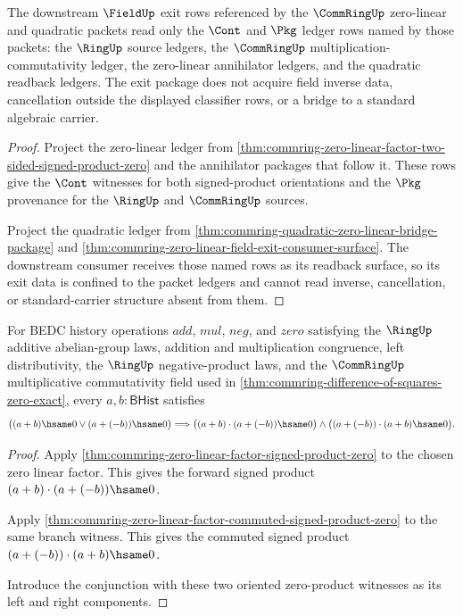 \begin{theorem}
\label{thm:commring-scoped-ledger-source}
The downstream $\FieldUp$ exit rows referenced by the $\CommRingUp$
zero-linear and quadratic packets read only the $\Cont$ and $\Pkg$ ledger rows
named by those packets: the $\RingUp$ source ledgers, the
$\CommRingUp$ multiplication-commutativity ledger, the zero-linear
annihilator ledgers, and the quadratic readback ledgers. The exit package does
not acquire field inverse data, cancellation outside the displayed classifier
rows, or a bridge to a standard algebraic carrier.
\end{theorem}
\begin{proof}
Project the zero-linear ledger from
\autoref{thm:commring-zero-linear-factor-two-sided-signed-product-zero} and
the annihilator packages that follow it. These rows give the $\Cont$ witnesses
for both signed-product orientations and the $\Pkg$ provenance for the
$\RingUp$ and $\CommRingUp$ sources.

Project the quadratic ledger from
\autoref{thm:commring-quadratic-zero-linear-bridge-package} and
\autoref{thm:commring-zero-linear-field-exit-consumer-surface}. The
downstream consumer receives those named rows as its readback surface, so its
exit data is confined to the packet ledgers and cannot read inverse,
cancellation, or standard-carrier structure absent from them.
\end{proof}

\begin{theorem}
\label{thm:commring-zero-linear-factor-two-sided-signed-product-zero}
For BEDC history operations $add$, $mul$, $neg$, and $zero$ satisfying the
$\RingUp$ additive abelian-group laws, addition and multiplication congruence,
left distributivity, the $\RingUp$ negative-product laws, and the
$\CommRingUp$ multiplicative commutativity field used in
\autoref{thm:commring-difference-of-squares-zero-exact}, every
$a,b : \mathsf{BHist}$ satisfies
$$
\bigl((a+b)\hsame0 \lor (a+(-b))\hsame0\bigr)
\Longrightarrow
\bigl((a+b)\cdot(a+(-b))\hsame0\bigr)
\land
\bigl((a+(-b))\cdot(a+b)\hsame0\bigr).
$$
\end{theorem}
\begin{proof}
Apply \autoref{thm:commring-zero-linear-factor-signed-product-zero} to the
chosen zero linear factor. This gives the forward signed product
$(a+b)\cdot(a+(-b))\hsame0$.

Apply \autoref{thm:commring-zero-linear-factor-commuted-signed-product-zero} to
the same branch witness. This gives the commuted signed product
$(a+(-b))\cdot(a+b)\hsame0$.

Introduce the conjunction with these two oriented zero-product witnesses as its
left and right components.
\end{proof}

